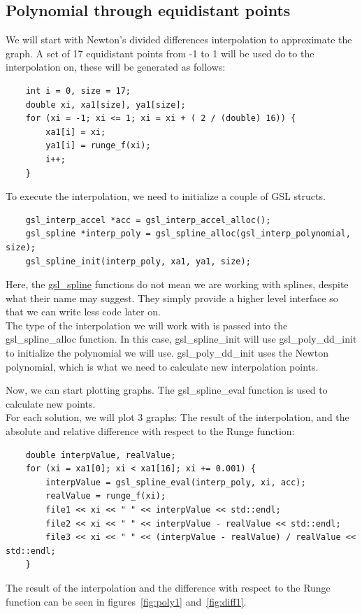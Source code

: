 \documentclass[11pt, a4paper, titlepage, openright]{article}
\begin{document}
\subsection{Polynomial through equidistant points}
\label{sec:firstpoly}
    We will start with Newton's divided differences interpolation to approximate the graph.
    A set of 17 equidistant points from -1 to 1 will be used do to the interpolation on, these will be generated as follows:
    \begin{lstlisting}
    int i = 0, size = 17;
    double xi, xa1[size], ya1[size];
    for (xi = -1; xi <= 1; xi = xi + ( 2 / (double) 16)) {
        xa1[i] = xi;
        ya1[i] = runge_f(xi);
        i++;
    }
    \end{lstlisting}
    To execute the interpolation, we need to initialize a couple of GSL structs.
    \begin{lstlisting}
    gsl_interp_accel *acc = gsl_interp_accel_alloc();
    gsl_spline *interp_poly = gsl_spline_alloc(gsl_interp_polynomial, size);
    gsl_spline_init(interp_poly, xa1, ya1, size);
    \end{lstlisting}
    Here, the \href{https://www.gnu.org/software/gsl/manual/html_node/1D-Higher_002dlevel-Interface.html#g_t1D-Higher_002dlevel-Interface}
    {gsl\_spline} functions do not mean we are working with splines, despite what their name may suggest.
    They simply provide a higher level interface so that we can write less code later on. \\ The type of the interpolation
    we will work with is passed into the gsl\_spline\_alloc function. In this case, gsl\_spline\_init  will
    use gsl\_poly\_dd\_init to initialize the polynomial we will use. gsl\_poly\_dd\_init uses the Newton polynomial,
    which is what we need to calculate new interpolation points.

    Now, we can start plotting graphs. The gsl\_spline\_eval function is used to calculate new points. \\
    For each solution, we will plot 3 graphs: The result of the interpolation, and the absolute and relative difference
    with respect to the Runge function:
    \begin{lstlisting}
    double interpValue, realValue;
    for (xi = xa1[0]; xi < xa1[16]; xi += 0.001) {
        interpValue = gsl_spline_eval(interp_poly, xi, acc);
        realValue = runge_f(xi);
        file1 << xi << " " << interpValue << std::endl;
        file2 << xi << " " << interpValue - realValue << std::endl;
        file3 << xi << " " << (interpValue - realValue) / realValue << std::endl;
    }
    \end{lstlisting}
    The result of the interpolation and the difference with respect to the Runge function can be seen in figures~\ref{fig:poly1} and~\ref{fig:diff1}.
\end{document}
